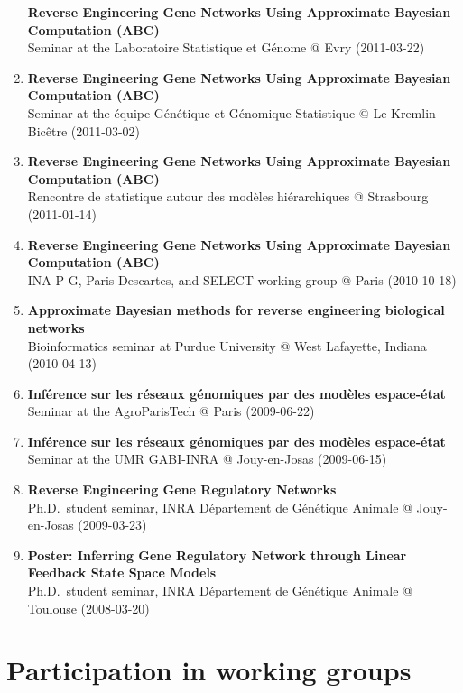 \documentclass[11pt, a4paper]{awesome-cv}
\begin{document}
\begin{enumerate}
  \textbf{Reverse Engineering Gene Networks Using Approximate Bayesian
  Computation (ABC)}\\
  Seminar at the Laboratoire Statistique et Génome @ Evry (2011-03-22)
\item
  \textbf{Reverse Engineering Gene Networks Using Approximate Bayesian
  Computation (ABC)}\\
  Seminar at the équipe Génétique et Génomique Statistique @ Le Kremlin
  Bicêtre (2011-03-02)
\item
  \textbf{Reverse Engineering Gene Networks Using Approximate Bayesian
  Computation (ABC)}\\
  Rencontre de statistique autour des modèles hiérarchiques @ Strasbourg
  (2011-01-14)
\item
  \textbf{Reverse Engineering Gene Networks Using Approximate Bayesian
  Computation (ABC)}\\
  INA P-G, Paris Descartes, and SELECT working group @ Paris
  (2010-10-18)
\item
  \textbf{Approximate Bayesian methods for reverse engineering
  biological networks}\\
  Bioinformatics seminar at Purdue University @ West Lafayette, Indiana
  (2010-04-13)
\item
  \textbf{Inférence sur les réseaux génomiques par des modèles
  espace-état}\\
  Seminar at the AgroParisTech @ Paris (2009-06-22)
\item
  \textbf{Inférence sur les réseaux génomiques par des modèles
  espace-état}\\
  Seminar at the UMR GABI-INRA @ Jouy-en-Josas (2009-06-15)
\item
  \textbf{Reverse Engineering Gene Regulatory Networks}\\
  Ph.D.~student seminar, INRA Département de Génétique Animale @
  Jouy-en-Josas (2009-03-23)
\item
  \textbf{Poster: Inferring Gene Regulatory Network through Linear
  Feedback State Space Models}\\
  Ph.D.~student seminar, INRA Département de Génétique Animale @
  Toulouse (2008-03-20)
\end{enumerate}

\hypertarget{participation-in-working-groups}{%
\section{Participation in working
groups}\label{participation-in-working-groups}}
\end{document}
